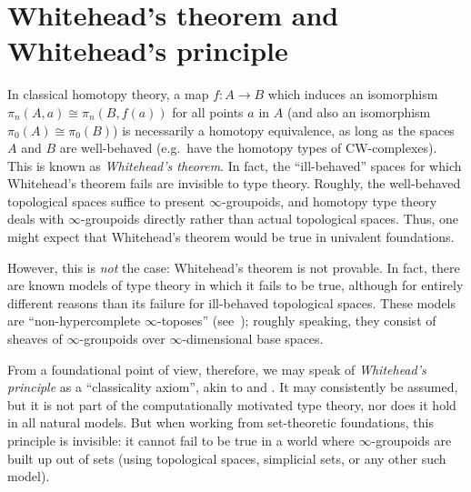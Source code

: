 %

%
%

\section{Whitehead's theorem and Whitehead's principle}
\label{sec:whitehead}

In classical homotopy theory, a map $f:A\to B$ which induces an isomorphism $\pi_n(A,a) \cong \pi_n(B,f(a))$ for all points $a$ in $A$ (and also an isomorphism $\pi_0(A)\cong\pi_0(B)$) is necessarily a homotopy equivalence, as long as the spaces $A$ and $B$ are well-behaved (e.g.\ have the homotopy types of CW-complexes).
%
%
This is known as \emph{Whitehead's theorem}.
In fact, the ``ill-behaved'' spaces for which Whitehead's theorem fails are invisible to type theory.
Roughly, the well-behaved topological spaces suffice to present $\infty$-groupoids,%
and homotopy type theory deals with $\infty$-groupoids directly rather than actual topological spaces.
Thus, one might expect that Whitehead's theorem would be true in univalent foundations.

However, this is \emph{not} the case: Whitehead's theorem is not provable.
In fact, there are known models of type theory in which it fails to be true, although for entirely different reasons than its failure for ill-behaved topological spaces.
These models are ``non-hypercomplete $\infty$-toposes''
%
%
(see~\cite{lurie:higher-topoi}); roughly speaking, they consist of sheaves of $\infty$-groupoids over $\infty$-dimensional base spaces.

%
%

From a foundational point of view, therefore, we may speak of \emph{Whitehead's principle} as a ``classicality axiom'', akin to \LEM{} and \choice{}.
It may consistently be assumed, but it is not part of the computationally motivated type theory, nor does it hold in all natural models.
But when working from set-theoretic foundations, this principle is invisible: it cannot fail to be true in a world where $\infty$-groupoids are built up out of sets (using topological spaces, simplicial sets, or any other such model).

